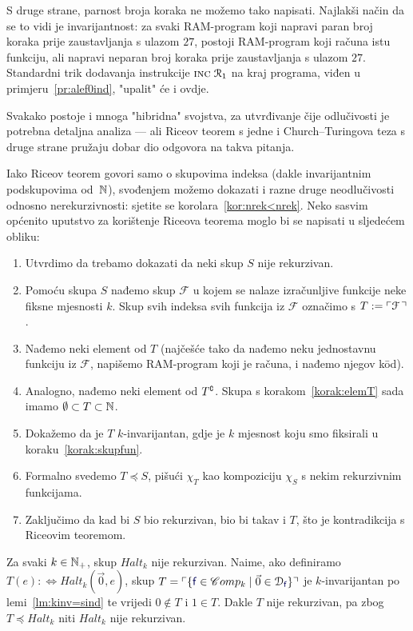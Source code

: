 S druge strane, parnost broja koraka ne možemo tako napisati. Najlakši način da se to vidi je invarijantnost: za svaki RAM-program koji napravi paran broj koraka prije zaustavljanja s ulazom $27$, postoji RAM-program koji računa istu funkciju, ali napravi neparan broj koraka prije zaustavljanja s ulazom $27$. Standardni trik dodavanja instrukcije $\textsc{inc}\;\mathcal R_{1}$ na kraj programa, viđen u primjeru~\ref{pr:alef0ind}, "upalit" će i ovdje.

Svakako postoje i mnoga "hibridna" svojstva, za utvrđivanje čije odlučivosti je potrebna detaljna analiza --- ali Riceov teorem s jedne i Church--\!Turingova teza s druge strane pružaju dobar dio odgovora na takva pitanja.

Iako Riceov teorem govori samo o skupovima indeksa (dakle invarijantnim podskupovima od~${\mathbb N}$), svođenjem možemo dokazati i razne druge neodlučivosti odnosno nerekurzivnosti: sjetite se korolara~\ref{kor:nrek<nrek}. Neko sasvim općenito uputstvo za korištenje Riceova teorema moglo bi se napisati u sljedećem obliku:

\begin{enumerate}
    \item Utvrdimo da trebamo dokazati da neki skup $S$ nije rekurzivan.
    \item\label{korak:skupfun} Pomoću skupa $S$ nađemo skup $\mathcal F$ u kojem se nalaze izračunljive funkcije neke fiksne mjesnosti $k$.
	    Skup svih indeksa svih funkcija iz $\mathcal F$ označimo s $T:=\ulcorner\mathcal F\,\urcorner$.
    \item\label{korak:elemT} Nađemo neki element od $T$ (najčešće tako da nađemo neku jednostavnu funkciju iz $\mathcal F\!$, napišemo RAM-program koji je računa, i nađemo njegov k\=od).
    \item Analogno, nađemo neki element od $T\sp{{\scriptscriptstyle\complement}}$. Skupa s korakom~\ref{korak:elemT} sada imamo $\emptyset\subset T\subset{\mathbb N}$.
    \item Dokažemo da je $T$ $k$-invarijantan, gdje je $k$ mjesnost koju smo fiksirali u koraku~\ref{korak:skupfun}.
    \item Formalno svedemo $T\!\preceq S$, pišući $\chi_T$ kao kompoziciju $\chi_S$ s nekim rekurzivnim funkcijama.
    \item Zaključimo da kad bi $S$ bio rekurzivan, bio bi takav i $T$, što je kontradikcija s Riceovim teoremom.
\end{enumerate}

\begin{primjer}[{name=[neodlučivost $k$-mjesnog brojevnog problema zaustavljanja]}]
    Za svaki $k\in{\mathbb N}_+$, skup $Halt_k$ nije rekurzivan. Naime, ako definiramo $T(e):\Longleftrightarrow Halt_k(\vec 0,e)$, skup $T=\kins{\{\f f\in\mathscr Comp_k\mid\vec 0\in\dom{\f f}\}}$ je $k$-invarijantan po lemi~\ref{lm:kinv=sind} te vrijedi $0\notin T$ i $1\in T$. Dakle $T$ nije rekurzivan, pa zbog $T\preceq Halt_k$ niti $Halt_k$ nije rekurzivan.
\end{primjer}
